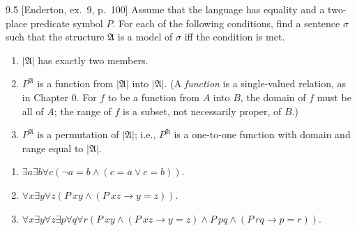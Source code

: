 \begin{exercise}{9.5}
  [Enderton, ex.~9, p.~100]
  Assume that the language has equality and a two-place predicate symbol $P$. For each of the following conditions, find a sentence $\sigma$ such that the structure $\mathfrak{A}$ is a model of $\sigma$ iff the condition is met.
  \begin{enumerate}[label=(\alph*)]
    \item $|\mathfrak{A}|$ has exactly two members.
    \item $P^{\mathfrak{A}}$ is a function from $|\mathfrak{A}|$ into $|\mathfrak{A}|$. (A \textit{function} is a single-valued relation, as in Chapter 0. For $f$ to be a function from $A$ into $B$, the domain of $f$ must be all of $A$; the range of $f$ is a subset, not necessarily proper, of $B$.)
    \item $P^{\mathfrak{A}}$ is a permutation of $|\mathfrak{A}|$; i.e., $P^{\mathfrak{A}}$ is a one-to-one function with domain and range equal to $|\mathfrak{A}|$.\qedhere
  \end{enumerate}
\end{exercise}

\begin{enumerate}
  \item $\exists a\exists b\forall c(\neg a=b\wedge(c=a\vee c=b))$.
  \item $\forall x\exists y\forall z(P\ xy\wedge(P\ xz\to y=z))$.
  \item $\forall x\exists y\forall z\exists p\forall q\forall r(P\ xy\wedge(P\ xz\to y=z)\wedge P\ pq\wedge(P\ rq\to p=r))$.
\end{enumerate}
